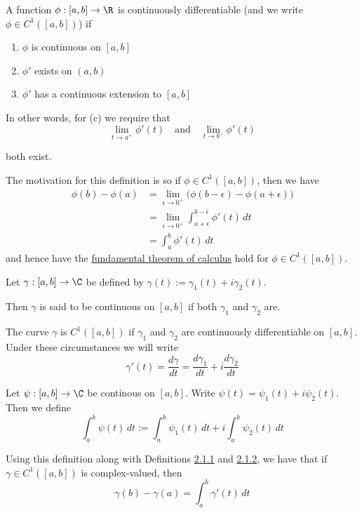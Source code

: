 \label{c1f6d35}

A function $\phi:[a,b]\to\R$ is continuously differentiable
(and we write $\phi\in C^1([a,b])$) if

\begin{enumerate}[label=(\alph*)]
	\item $\phi$ is continuous on $[a,b]$
	\item $\phi'$ exists on $(a,b)$
	\item $\phi'$ has a continuous extension to $[a,b]$
\end{enumerate}

In other words, for (c) we require that
$$
	\lim_{t\to a^+}\phi'(t)\quad\text{and}\quad\lim_{t\to b^-}\phi'(t)
$$

both exist.

The motivation for this definition is so if $\phi\in C^1([a,b])$, then
we have
\begin{align*}
	\phi(b)-\phi(a)
	 & =\lim_{\epsilon\to0^+}\big(\phi(b-\epsilon)-\phi(a+\epsilon)\big) \\
	 & =\lim_{\epsilon\to0^+}\int_{a+\epsilon}^{b-\epsilon}\phi'(t)\,dt  \\
	 & =\int_a^b\phi'(t)\,dt
\end{align*}
and hence have the \hyperref[b869dc0]{fundamental theorem of calculus}
hold for $\phi\in C^1([a,b])$.

\label{e4132bc}

Let $\gamma:[a,b]\to\C$ be defined by $\gamma(t):=\gamma_1(t) +
	i\gamma_2(t)$.

Then $\gamma$ is said to be continuous on $[a,b]$ if both $\gamma_1$
and $\gamma_2$ are.

The curve $\gamma$ is $C^1([a,b])$ if $\gamma_1$ and $\gamma_2$ are
continuously differentiable on $[a,b]$. Under these circumstances we
will write
$$
	\gamma'(t)=\frac{d\gamma}{dt}=\frac{d\gamma_1}{dt}+i\frac{d\gamma_2}{dt}
$$

\label{c511702}

Let $\psi:[a,b]\to\C$ be continous on $[a,b]$. Write
$\psi(t)=\psi_1(t)+i\psi_2(t)$. Then we define
$$
	\int_a^b\psi(t)\,dt:=\int_a^b\psi_1(t)\,dt+i\int_a^b\psi_2(t)\,dt
$$

Using this definition along with Definitions \hyperref[c1f6d35]{2.1.1}
and \hyperref[e4132bc]{2.1.2}, we have that if $\gamma\in C^1([a,b])$
is complex-valued, then
$$
	\gamma(b)-\gamma(a)=\int_a^b\gamma'(t)\,dt
$$


